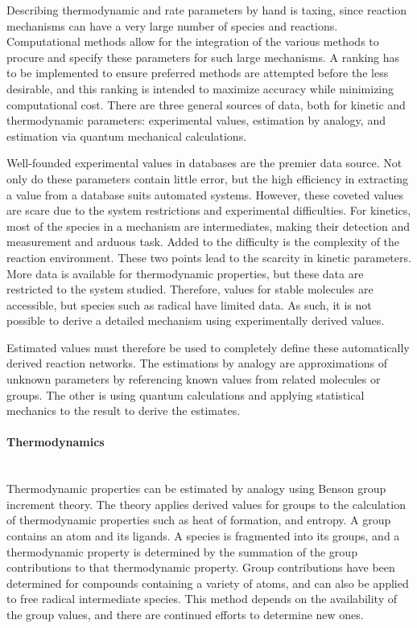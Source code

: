 \documentclass[12pt]{article}
\begin{document}
Describing thermodynamic and rate parameters by hand is taxing, since reaction mechanisms can have a very large number of species and reactions. Computational methods allow for the integration of the various methods to procure and specify these parameters for such large mechanisms. A ranking has to be implemented to ensure preferred methods are attempted before the less desirable, and this ranking is intended to maximize accuracy while minimizing computational cost. There are three general sources of data, both for kinetic and thermodynamic parameters: experimental values, estimation by analogy, and estimation via quantum mechanical calculations.

Well-founded experimental values in databases are the premier data source. Not only do these parameters contain little error, but the high efficiency in extracting a value from a database suits automated systems. However, these coveted values are scare due to the system restrictions and experimental difficulties. For kinetics, most of the species in a mechanism are intermediates, making their detection and measurement and arduous task. Added to the difficulty is the complexity of the reaction environment. These two points lead to the scarcity in kinetic parameters. More data is available for thermodynamic properties, but these data are restricted to the system studied. Therefore, values for stable molecules are accessible, but species such as radical have limited data.  As such, it is not possible to derive a detailed mechanism using experimentally derived values.

Estimated values must therefore be used to completely define these automatically derived reaction networks. The estimations by analogy are approximations of unknown parameters by referencing known values from related molecules or groups. The other is using quantum calculations and applying statistical mechanics to the result to derive the estimates.

\paragraph{Thermodynamics}\mbox{}\\
Thermodynamic properties can be estimated by analogy using Benson group increment theory. The theory applies derived values for groups to the calculation of thermodynamic properties such as heat of formation, and entropy. A group contains an atom and its ligands. A species is fragmented into its groups, and a thermodynamic property is determined by the summation of the group contributions to that thermodynamic property. Group contributions have been determined for compounds containing a variety of atoms, and can also be applied to free radical intermediate species. This method depends on the availability of the group values, and there are continued efforts to determine new ones.
\end{document}
